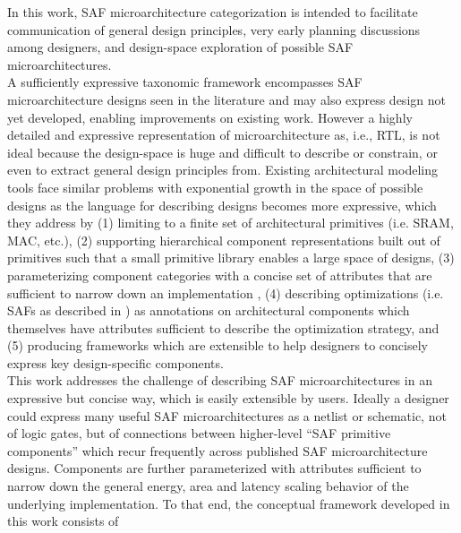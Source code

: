 In this work, SAF microarchitecture categorization is intended to facilitate communication of general design principles, very early planning discussions among designers, and design-space exploration of possible SAF microarchitectures.  \\
%
A sufficiently expressive taxonomic framework encompasses SAF microarchitecture designs seen in the literature and may also express design not yet developed, enabling improvements on existing work. However a highly detailed and expressive representation of microarchitecture as, i.e., RTL, is not ideal because the design-space is huge and difficult to describe or constrain, or even to extract general design principles from. Existing architectural modeling tools face similar problems with exponential growth in the space of possible designs as the language for describing designs becomes more expressive, which they address by (1) limiting to a finite set of architectural primitives (i.e. SRAM, MAC, etc.)\cite{timeloop}, (2) supporting hierarchical component representations built out of primitives \cite{accelergy} such that a small primitive library enables a large space of designs, (3) parameterizing component categories with a concise set of attributes that are sufficient to narrow down an implementation \cite{accelergy}, (4) describing optimizations (i.e. SAFs as described in \cite{sparseloop}) as annotations on architectural components which themselves have attributes sufficient to describe the optimization strategy, and (5) producing frameworks which are extensible to help designers to concisely express key design-specific components.  \\
%
This work addresses the challenge of describing SAF microarchitectures in an expressive but concise way, which is easily extensible by users. Ideally a designer could express many useful SAF microarchitectures as a netlist or schematic, not of logic gates, but of connections between higher-level ``SAF primitive components'' which recur frequently across published SAF microarchitecture designs. Components are further parameterized with attributes sufficient to narrow down the general energy, area and latency scaling behavior of the underlying implementation. To that end, the conceptual framework developed in this work consists of
